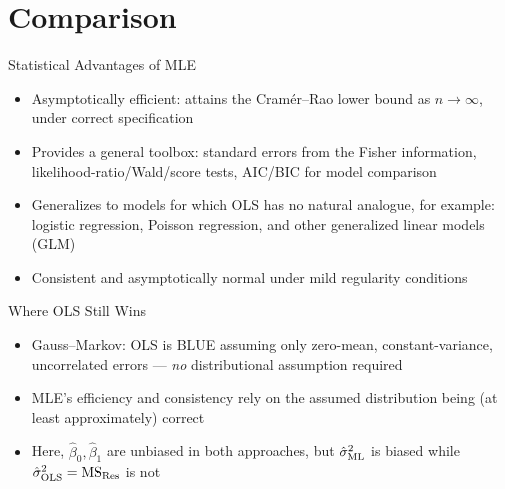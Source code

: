 \section{Comparison}


\begin{frame}{Statistical Advantages of MLE}
	\begin{itemize}
		\item Asymptotically efficient: attains the Cram\'er--Rao lower bound as $n\to\infty$, under correct specification
		\item Provides a general toolbox: standard errors from the Fisher information, likelihood-ratio/Wald/score tests, AIC/BIC for model comparison
		\item Generalizes to models for which OLS has no natural analogue, for example: logistic regression, Poisson regression, and other generalized linear models (GLM)
		\item Consistent and asymptotically normal under mild regularity conditions
	\end{itemize}
\end{frame}


\begin{frame}{Where OLS Still Wins}
	\begin{itemize}
		\item Gauss--Markov: OLS is BLUE assuming only zero-mean, constant-variance, uncorrelated errors --- \emph{no} distributional assumption required
		\item MLE's efficiency and consistency rely on the assumed distribution being (at least approximately) correct
		\item Here, $\hat\beta_0,\hat\beta_1$ are unbiased in both approaches, but $\hat\sigma^2_{\mathrm{ML}}$ is biased while $\hat\sigma^2_{\mathrm{OLS}} = \mathrm{MS}_{\mathrm{Res}}$ is not
	\end{itemize}
\end{frame}

